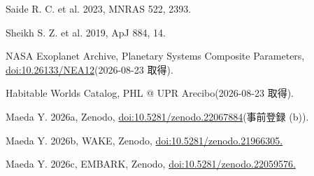 \documentclass[11pt]{article}
\begin{document}
\noindent [25] Saide R. C. et al. 2023, MNRAS 522, 2393.\par\smallskip
\noindent [26] Sheikh S. Z. et al. 2019, ApJ 884, 14.\par\smallskip
\noindent [27] NASA Exoplanet Archive, Planetary Systems Composite Parameters, \url{doi:10.26133/NEA12}(2026-08-23 取得).\par\smallskip
\noindent [28] Habitable Worlds Catalog, PHL @ UPR Arecibo(2026-08-23 取得).\par\smallskip
\noindent [29] Maeda Y. 2026a, Zenodo, \url{doi:10.5281/zenodo.22067884}(事前登録 (b)).\par\smallskip
\noindent [30] Maeda Y. 2026b, WAKE, Zenodo, \url{doi:10.5281/zenodo.21966305.}\par\smallskip
\noindent [31] Maeda Y. 2026c, EMBARK, Zenodo, \url{doi:10.5281/zenodo.22059576.}\par\smallskip
\end{document}
